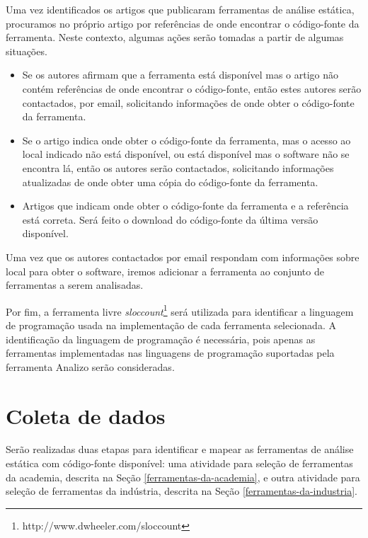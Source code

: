 Uma vez identificados os artigos que publicaram ferramentas de análise
estática, procuramos no próprio artigo por referências de onde encontrar o
código-fonte da ferramenta. Neste contexto, algumas ações serão tomadas a
partir de algumas situações.

\begin{itemize}

  \item Se os autores afirmam que a ferramenta está disponível mas o artigo
    não contém referências de onde encontrar o código-fonte, então estes
    autores serão contactados, por email, solicitando informações de onde
    obter o código-fonte da ferramenta.

  \item Se o artigo indica onde obter o código-fonte da ferramenta, mas o acesso ao local
    indicado não está disponível, ou está disponível mas o software não se
    encontra lá, então os autores serão contactados, solicitando informações
    atualizadas de onde obter uma cópia do código-fonte da ferramenta.

  \item Artigos que indicam onde obter o código-fonte da ferramenta e a referência
    está correta. Será feito o download do código-fonte da última versão
    disponível.

\end{itemize}

Uma vez que os autores contactados por email respondam com informações sobre
local para obter o software, iremos adicionar a ferramenta ao conjunto de ferramentas
a serem analisadas.

Por fim, a ferramenta livre {\it
sloccount}\footnote{http://www.dwheeler.com/sloccount} será  utilizada para
identificar a linguagem de programação usada na implementação de cada
ferramenta selecionada.  A identificação da linguagem de programação é
necessária, pois apenas as ferramentas implementadas nas linguagens de
programação suportadas pela ferramenta Analizo serão consideradas.

\section{Coleta de dados} \label{coleta}

Serão realizadas duas etapas para identificar e mapear as ferramentas de
análise estática com código-fonte disponível: uma atividade para seleção de
ferramentas da academia, descrita na Seção \ref{ferramentas-da-academia}, e
outra atividade para seleção de ferramentas da indústria, descrita na Seção
\ref{ferramentas-da-industria}.


